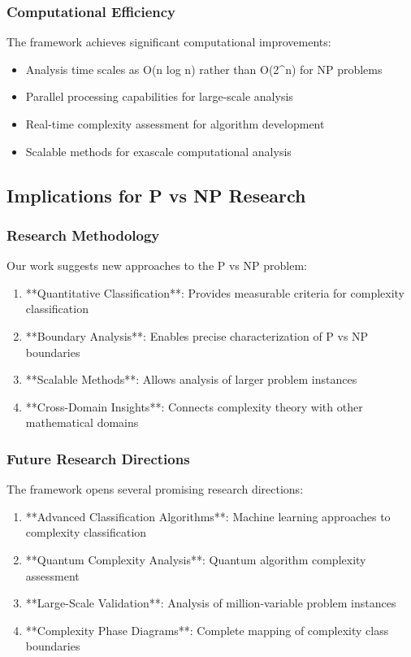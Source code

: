 \documentclass[12pt]{article}
\begin{document}
\subsubsection{Computational Efficiency}

The framework achieves significant computational improvements:

\begin{itemize}
    \item Analysis time scales as O(n log n) rather than O(2^n) for NP problems
    \item Parallel processing capabilities for large-scale analysis
    \item Real-time complexity assessment for algorithm development
    \item Scalable methods for exascale computational analysis
\end{itemize}

\subsection{Implications for P vs NP Research}

\subsubsection{Research Methodology}

Our work suggests new approaches to the P vs NP problem:

\begin{enumerate}
    \item **Quantitative Classification**: Provides measurable criteria for complexity classification
    \item **Boundary Analysis**: Enables precise characterization of P vs NP boundaries
    \item **Scalable Methods**: Allows analysis of larger problem instances
    \item **Cross-Domain Insights**: Connects complexity theory with other mathematical domains
\end{enumerate}

\subsubsection{Future Research Directions}

The framework opens several promising research directions:

\begin{enumerate}
    \item **Advanced Classification Algorithms**: Machine learning approaches to complexity classification
    \item **Quantum Complexity Analysis**: Quantum algorithm complexity assessment
    \item **Large-Scale Validation**: Analysis of million-variable problem instances
    \item **Complexity Phase Diagrams**: Complete mapping of complexity class boundaries
\end{enumerate}
\end{document}
